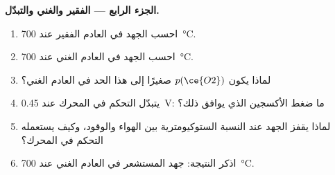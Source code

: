 \begin{problem}
\medskip\noindent\textbf{الجزء الرابع --- الفقير والغني والتبدّل.}
\begin{enumerate}[resume]
  \item احسب الجهد في العادم الفقير عند \qty{700}{\celsius}.
  \item احسب الجهد في العادم الغني عند \qty{700}{\celsius}.
  \item لماذا يكون $p(\ce{O2})$ صغيرًا إلى هذا الحد في العادم الغني؟
  \item يتبدّل التحكم في المحرك عند \qty{0.45}{V}: ما ضغط الأكسجين الذي
        يوافق ذلك؟
  \item لماذا يقفز الجهد عند النسبة الستوكيومترية بين الهواء والوقود، وكيف
        يستعمله التحكم في المحرك؟
  \item اذكر النتيجة: جهد المستشعر في العادم الغني عند \qty{700}{\celsius}.
\end{enumerate}
\end{problem}
